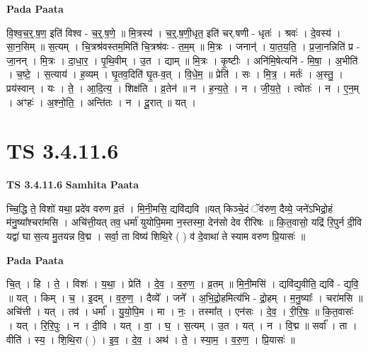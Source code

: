 \documentclass[17pt]{extarticle}
\begin{document}
\textbf{Pada Paata} \newline

वि॒श्व॒च॒र्॒.ष॒ण॒ इति॑ विश्व - च॒र्॒.ष॒णे॒ ॥ मि॒त्रस्य॑ । च॒र्॒.ष॒णी॒धृत॒ इति॑ चर्.षणी - धृतः॑ । श्रवः॑ । दे॒वस्य॑ । सा॒न॒सिम् ॥ स॒त्यम् । चि॒त्रश्र॑वस्तम॒मिति॑ चि॒त्रश्र॑वः - त॒म॒म् ॥ मि॒त्रः । जनान्॑ । या॒त॒य॒ति॒ । प्र॒जा॒नन्निति॑ प्र - जा॒नन् । मि॒त्रः । दा॒धा॒र॒ । पृ॒थि॒वीम् । उ॒त । द्याम् ॥ मि॒त्रः । कृ॒ष्टीः । अनि॑मि॒षेत्यनि॑ - मि॒षा॒ । अ॒भीति॑ । च॒ष्टे॒ । स॒त्याय॑ । ह॒व्यम् । घृ॒तव॒दिति॑ घृ॒त-व॒त् । वि॒धे॒म॒ ॥ प्रेति॑ । सः । मि॒त्र॒ । मर्तः॑ । अ॒स्तु॒ । प्रय॑स्वान् । यः । ते॒ । आ॒दि॒त्य॒ । शिक्ष॑ति । व्र॒तेन॑ ॥ न । ह॒न्य॒ते॒ । न । जी॒य॒ते॒ । त्वोतः॑ । न । ए॒न॒म् । अꣳहः॑ । अ॒श्नो॒ति॒ । अन्ति॑तः । न । दू॒रात् ॥ यत् ।  \newline




\section*{ TS 3.4.11.6 }

\textbf{TS 3.4.11.6 } \newline
\textbf{Samhita Paata} \newline

च्चि॒द्धि ते॒ विशो॑ यथा॒ प्रदे॑व वरुण व्र॒तं । मि॒नी॒मसि॒ द्यवि॑द्यवि ॥यत् किञ्चे॒दं ॅव॑रुण॒ दैव्ये॒ जने॑ऽभिद्रो॒हं म॑नु॒ष्या᳚श्चरा॑मसि । अचि॑त्ती॒यत् तव॒ धर्मा॑ युयोपि॒ममा न॒स्तस्मा॒ देन॑सो देव रीरिषः ॥ कि॒त॒वासो॒ यद्रि॑ रि॒पुर्न दी॒वि यद्वा॑ घा स॒त्य मु॒तयन्न वि॒द्म । सर्वा॒ ता विष्य॑ शिथि॒रे ( ) व॑ दे॒वाथा॑ ते स्याम वरुण प्रि॒यासः॑ ॥ \newline

\textbf{Pada Paata} \newline

चि॒त् । हि । ते॒ । विशः॑ । य॒था॒ । प्रेति॑ । दे॒व॒ । व॒रु॒ण॒ । व्र॒तम् ॥ मि॒नी॒मसि॑ । द्यवि॑द्य॒वीति॒ द्यवि॑ - द्य॒वि॒ ॥ यत् । किम् । च॒ । इ॒दम् । व॒रु॒ण॒ । दैव्ये᳚ । जने᳚ । अ॒भि॒द्रो॒हमित्य॑भि - द्रो॒हम् । म॒नु॒ष्याः᳚ । चरा॑मसि ॥ अचि॑त्ती । यत् । तव॑ । धर्मा᳚ । यु॒यो॒पि॒म । मा । नः॒ । तस्मा᳚त् । एन॑सः । दे॒व॒ । री॒रि॒षः॒ ॥ कि॒त॒वासः॑ । यत् । रि॒रि॒पुः । न । दी॒वि । यत् । वा॒ । घ॒ । स॒त्यम् । उ॒त । यत् । न । वि॒द्म ॥ सर्वा᳚ । ता । वीति॑ । स्य॒ । शि॒थि॒रा ( ) । इ॒व॒ । दे॒व॒ । अथ॑ । ते॒ । स्या॒म॒ । व॒रु॒ण॒ । प्रि॒यासः॑ ॥  \newline
\end{document}
